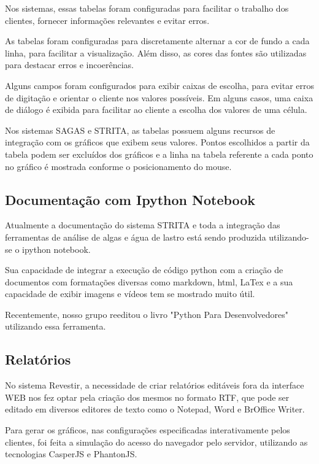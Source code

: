 \documentclass[]{article}
\begin{document}
Nos sistemas, essas tabelas foram configuradas para facilitar o trabalho dos clientes, fornecer informações relevantes e evitar erros. 

As tabelas foram configuradas para discretamente alternar a cor de fundo a cada linha, para facilitar a visualização. Além disso, as cores das fontes são utilizadas para destacar erros e incoerências. 

Alguns campos foram configurados para exibir caixas de escolha, para evitar erros de digitação e orientar o cliente nos valores possíveis. Em alguns casos, uma caixa de diálogo é exibida para facilitar ao cliente a escolha dos valores de uma célula.

Nos sistemas SAGAS e STRITA, as tabelas possuem alguns recursos de integração com os gráficos que exibem seus valores. Pontos escolhidos a partir da tabela podem ser excluídos dos gráficos e a linha na tabela referente a cada ponto no gráfico é mostrada conforme o posicionamento do mouse.

\subsection{Documentação com Ipython Notebook}

Atualmente a documentação do sistema STRITA e toda a integração das ferramentas de análise de algas e água de lastro está sendo produzida utilizando-se o ipython notebook. \cite{perez:Online}

Sua capacidade de integrar a execução de código python com a criação de documentos com formatações diversas como markdown, html, LaTex e a sua capacidade de exibir imagens e vídeos tem se mostrado muito útil.

Recentemente, nosso grupo reeditou o livro "Python Para Desenvolvedores" utilizando essa ferramenta. \cite{PythonPD:Online}

\subsection{Relatórios}

No sistema Revestir, a necessidade de criar relatórios editáveis fora da interface WEB nos fez optar pela criação dos mesmos no formato RTF, que pode ser editado em diversos editores de texto como o Notepad, Word e BrOffice Writer. 

Para gerar os gráficos, nas configurações especificadas interativamente pelos clientes, foi feita a simulação do acesso do navegador pelo servidor, utilizando as tecnologias CasperJS e PhantonJS.
\end{document}
